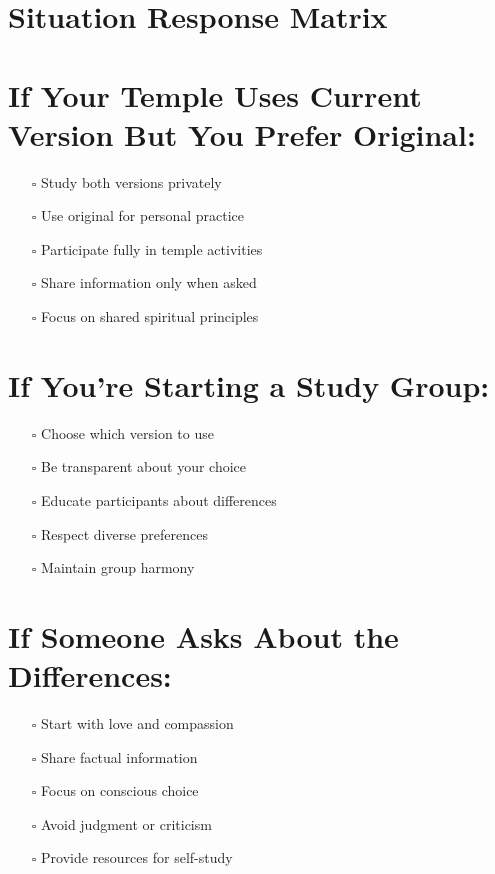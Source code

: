 \documentclass[11pt,twoside]{book}
\begin{document}
\section*{Situation Response Matrix}
\label{sec:org07ca1f9}

\section*{If Your Temple Uses Current Version But You Prefer Original:}
\label{sec:org68b1200}
\begin{itemize}
\item[{$\square$}] Study both versions privately
\item[{$\square$}] Use original for personal practice
\item[{$\square$}] Participate fully in temple activities
\item[{$\square$}] Share information only when asked
\item[{$\square$}] Focus on shared spiritual principles
\end{itemize}
\section*{If You're Starting a Study Group:}
\label{sec:orga3b96ca}
\begin{itemize}
\item[{$\square$}] Choose which version to use
\item[{$\square$}] Be transparent about your choice
\item[{$\square$}] Educate participants about differences
\item[{$\square$}] Respect diverse preferences
\item[{$\square$}] Maintain group harmony
\end{itemize}
\section*{If Someone Asks About the Differences:}
\label{sec:org7b01010}
\begin{itemize}
\item[{$\square$}] Start with love and compassion
\item[{$\square$}] Share factual information
\item[{$\square$}] Focus on conscious choice
\item[{$\square$}] Avoid judgment or criticism
\item[{$\square$}] Provide resources for self-study
\end{itemize}
\end{document}
